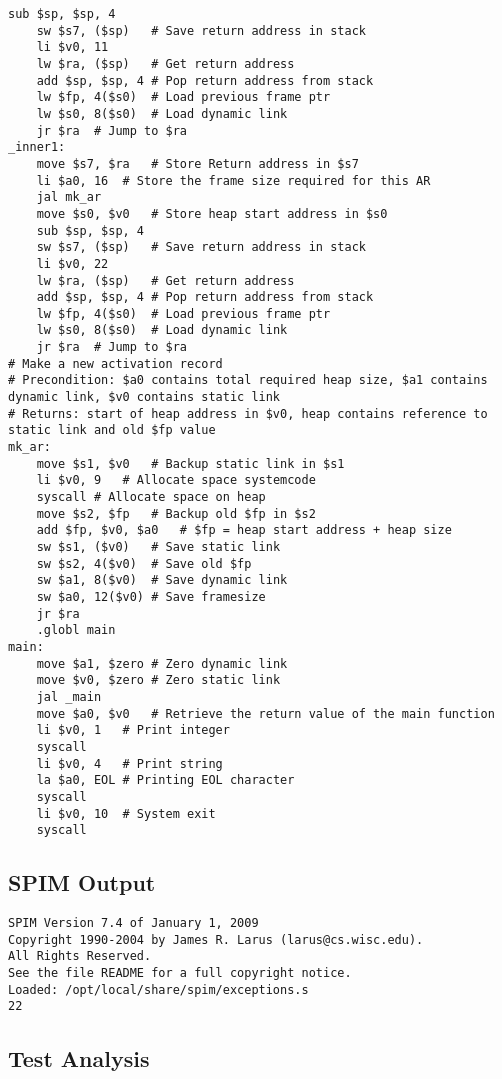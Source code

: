 \begin{lstlisting}[showstringspaces=false,breaklines=true,backgroundcolor=\color{light-gray}, captionpos=b]
	sub $sp, $sp, 4
	sw $s7, ($sp)	# Save return address in stack
	li $v0, 11
	lw $ra, ($sp)	# Get return address
	add $sp, $sp, 4	# Pop return address from stack
	lw $fp, 4($s0)	# Load previous frame ptr
	lw $s0, 8($s0)	# Load dynamic link
	jr $ra	# Jump to $ra
_inner1:
	move $s7, $ra	# Store Return address in $s7
	li $a0, 16	# Store the frame size required for this AR
	jal mk_ar
	move $s0, $v0	# Store heap start address in $s0
	sub $sp, $sp, 4
	sw $s7, ($sp)	# Save return address in stack
	li $v0, 22
	lw $ra, ($sp)	# Get return address
	add $sp, $sp, 4	# Pop return address from stack
	lw $fp, 4($s0)	# Load previous frame ptr
	lw $s0, 8($s0)	# Load dynamic link
	jr $ra	# Jump to $ra
# Make a new activation record
# Precondition: $a0 contains total required heap size, $a1 contains dynamic link, $v0 contains static link
# Returns: start of heap address in $v0, heap contains reference to static link and old $fp value
mk_ar:
	move $s1, $v0	# Backup static link in $s1
	li $v0, 9	# Allocate space systemcode
	syscall	# Allocate space on heap
	move $s2, $fp	# Backup old $fp in $s2
	add $fp, $v0, $a0	# $fp = heap start address + heap size
	sw $s1, ($v0)	# Save static link
	sw $s2, 4($v0)	# Save old $fp
	sw $a1, 8($v0)	# Save dynamic link
	sw $a0, 12($v0)	# Save framesize
	jr $ra
	.globl main
main:
	move $a1, $zero	# Zero dynamic link
	move $v0, $zero	# Zero static link
	jal _main
	move $a0, $v0	# Retrieve the return value of the main function
	li $v0, 1	# Print integer
	syscall
	li $v0, 4	# Print string
	la $a0, EOL	# Printing EOL character
	syscall
	li $v0, 10	# System exit
	syscall

\end{lstlisting}\subsection{SPIM Output}
\begin{verbatim}
SPIM Version 7.4 of January 1, 2009
Copyright 1990-2004 by James R. Larus (larus@cs.wisc.edu).
All Rights Reserved.
See the file README for a full copyright notice.
Loaded: /opt/local/share/spim/exceptions.s
22
\end{verbatim}\subsection{Test Analysis}

